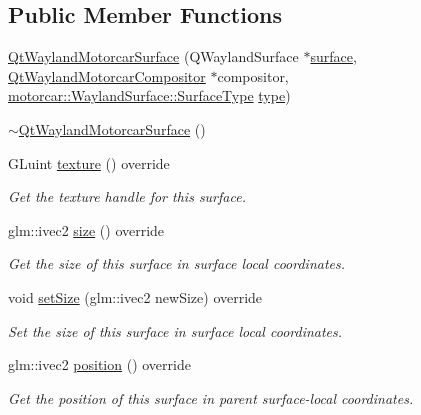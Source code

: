 \subsection*{Public Member Functions}
\begin{DoxyCompactItemize}
\item 
\hyperlink{classqtmotorcar_1_1QtWaylandMotorcarSurface_a054d4981e7da338c72e4fa6572869b60}{Qt\-Wayland\-Motorcar\-Surface} (Q\-Wayland\-Surface $\ast$\hyperlink{simple-egl_8cpp_a0720952aa1caded45b5bcdce589663a9}{surface}, \hyperlink{classqtmotorcar_1_1QtWaylandMotorcarCompositor}{Qt\-Wayland\-Motorcar\-Compositor} $\ast$compositor, \hyperlink{classmotorcar_1_1WaylandSurface_a7715a41b6776800656722407ec01e0a5}{motorcar\-::\-Wayland\-Surface\-::\-Surface\-Type} \hyperlink{classmotorcar_1_1WaylandSurface_a0e6e5e2455666f607a8ddb2479ba8e88}{type})
\item 
\hyperlink{classqtmotorcar_1_1QtWaylandMotorcarSurface_a0d9d57d75c14c209484174e47308f72f}{$\sim$\-Qt\-Wayland\-Motorcar\-Surface} ()
\item 
G\-Luint \hyperlink{classqtmotorcar_1_1QtWaylandMotorcarSurface_a573c52cdacb8f16c06ecd111bddabef6}{texture} () override
\begin{DoxyCompactList}\small\item\em Get the texture handle for this surface. \end{DoxyCompactList}\item 
glm\-::ivec2 \hyperlink{classqtmotorcar_1_1QtWaylandMotorcarSurface_ad5e6f75c146a2952652deaf866ee22a7}{size} () override
\begin{DoxyCompactList}\small\item\em Get the size of this surface in surface local coordinates. \end{DoxyCompactList}\item 
void \hyperlink{classqtmotorcar_1_1QtWaylandMotorcarSurface_abb0d9d5b6a226ab201fc1c0065d1843a}{set\-Size} (glm\-::ivec2 new\-Size) override
\begin{DoxyCompactList}\small\item\em Set the size of this surface in surface local coordinates. \end{DoxyCompactList}\item 
glm\-::ivec2 \hyperlink{classqtmotorcar_1_1QtWaylandMotorcarSurface_ad405b91565405e6a08d86ac5d59f3f08}{position} () override
\begin{DoxyCompactList}\small\item\em Get the position of this surface in parent surface-\/local coordinates. \end{DoxyCompactList}\item 

\end{DoxyCompactItemize}
